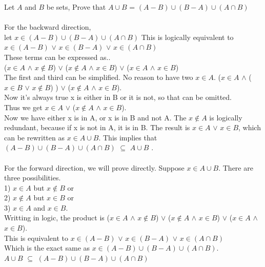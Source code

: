\documentclass[12pt]{article}
\begin{document}
\begin{enumerate}
			Let $A$ and $B$ be sets, Prove that $A \cup B$ = $(A - B)\cup(B-A)\cup
			(A\cap B)$\\
			\\For the backward direction,\\
			let $x\in(A - B)\cup(B-A)\cup(A\cap B)$ This is logically equivalent to\
 	 		$x\in(A - B)$ $\vee$ $x\in(B - A)$ $\vee$ $x\in(A\cap B)$\\
 	 		These terms can be expressed as..\\
 	 		($x\in A$ $\wedge$ $x\notin B$) $\vee$ ($x\notin A$ $\wedge$ $x\in B$) $\vee$ ($x\in A$ $\wedge$ $x\in B$)\\The first and third can be simplified. No reason to have two $x\in A$.
 	 		($x\in A$ $\wedge$ ($x\in B$ $\vee$ $x\notin B$) ) $\vee$ ($x\notin A$ $\wedge$ $x\in B$).
 	 		\\Now it's always true x is either in B or it is not, so that can be omitted.\\
 	 		Thus we get $x\in A$ $\vee$ ($x\notin A$ $\wedge$ $x\in B$). \\
 	 		Now we have either x is in A, or x is in B and not A. The $x\notin A$ is 
 	 		logically redundant, because if x is not in A, it is in B. The result is $x
 	 		\in A$ $\vee$ $x\in B$, which can be rewritten as $x\in A\cup B$. This 
 	 		implies that $(A - B)\cup(B-A)\cup (A\cap B)$ $\subseteq$ $A \cup B$ 
 	 		.\\
 	 		\\ For the forward direction, we will prove directly. Suppose $x\in A\cup B$. 
 	 		There are three possibilities.\\1) $x\in A$ but $x\notin B$ or\\
 	 		2) $x\notin A$ but $x\in B$ or \\3) $x\in A$ and $x\in B$.\\ 
 	 		Writting in logic,
 	 		the product is ($x\in A$ $\wedge$ $x\notin B$) $\vee$ ($x\notin A$ $\wedge$ 
 	 		$x\in B$) $\vee$ ($x\in A$ $\wedge$ $x\in B$). 
 	 		\\This is equivalent to $x\in(A - B)$ $\vee$ $x\in(B - A)$ $\vee$ $x\in(A\cap B)$
 	 		\\Which is the exact same as $x\in(A - B)\cup(B-A)\cup(A\cap B)$.\\
 	 		$A \cup B$ $\subseteq$ $(A - B)\cup(B-A)\cup (A\cap B)$
 	 		\fboxsep=2mm \fboxrule=1mm 
 	 		

\end{enumerate}
\end{document}
